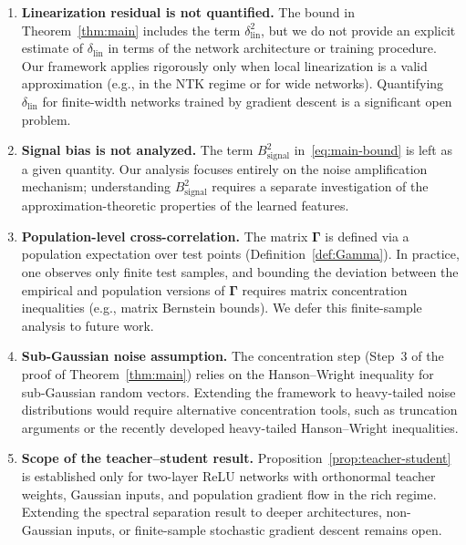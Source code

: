 \documentclass[12pt]{amsart}
\theoremstyle{definition}
\theoremstyle{remark}
\begin{document}
\begin{enumerate}
  \item \textbf{Linearization residual is not quantified.}
    The bound in Theorem~\ref{thm:main} includes the term
    $\delta_{\mathrm{lin}}^{2}$, but we do not provide an explicit estimate of
    $\delta_{\mathrm{lin}}$ in terms of the network architecture or training
    procedure.  Our framework applies rigorously only when local linearization
    is a valid approximation (e.g., in the NTK regime or for wide networks).
    Quantifying $\delta_{\mathrm{lin}}$ for finite-width networks trained by
    gradient descent is a significant open problem.

  \item \textbf{Signal bias is not analyzed.}
    The term $B_{\mathrm{signal}}^{2}$ in~\eqref{eq:main-bound} is left as a
    given quantity.  Our analysis focuses entirely on the noise amplification
    mechanism; understanding $B_{\mathrm{signal}}^{2}$ requires a separate
    investigation of the approximation-theoretic properties of the learned
    features.

  \item \textbf{Population-level cross-correlation.}
    The matrix $\boldsymbol{\Gamma}$ is defined via a population expectation
    over test points (Definition~\ref{def:Gamma}).  In practice, one observes
    only finite test samples, and bounding the deviation between the empirical
    and population versions of $\boldsymbol{\Gamma}$ requires matrix
    concentration inequalities (e.g., matrix Bernstein bounds).  We defer this
    finite-sample analysis to future work.

  \item \textbf{Sub-Gaussian noise assumption.}
    The concentration step (Step~3 of the proof of Theorem~\ref{thm:main})
    relies on the Hanson--Wright inequality for sub-Gaussian random vectors.
    Extending the framework to heavy-tailed noise distributions would require
    alternative concentration tools, such as truncation arguments or the
    recently developed heavy-tailed Hanson--Wright inequalities.

  \item \textbf{Scope of the teacher--student result.}
    Proposition~\ref{prop:teacher-student} is established only for two-layer
    ReLU networks with orthonormal teacher weights, Gaussian inputs, and
    population gradient flow in the rich regime.  Extending the spectral
    separation result to deeper architectures, non-Gaussian inputs, or
    finite-sample stochastic gradient descent remains open.
\end{enumerate}
\end{document}
